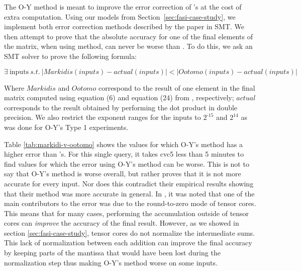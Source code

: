 The O-Y method is meant to improve the error correction of \citeauthor{markidis}'s at the cost of extra computation.  Using our models from Section~\ref{sec:fasi-case-study}, we implement both error correction methods described by the paper in SMT.  We then attempt to prove that the absolute accuracy for one of the final elements of the matrix, when using \cite{ootomo2022recovering} method, can never be worse than \cite{markidis}. To do this, we ask an SMT solver to prove the following formula:
\begin{myprop}
$\exists~\text{inputs}~s.t.~|Markidis(inputs) - actual(inputs)| < |Ootomo(inputs) - actual(inputs)|$ 
\end{myprop}
Where $Markidis$ and $Ootomo$ correspond to the result of one element in the final matrix computed using equation (6) and equation (24) from \citet{ootomo2022recovering}, respectively; $actual$ corresponds to the result obtained by performing the dot product in double precision. We also restrict the exponent ranges for the inputs to $2^{\text{-}15}$ and $2^{14}$ as was done for O-Y's Type 1 experiments.

Table \ref{tab:markidi-v-ootomo} shows the values for which O-Y's method has a higher error than \citeauthor{markidis}'s.  For this single query, it takes cvc5 less than 5 minutes
to find values for which the error using O-Y's method can be worse.  This is not to say that O-Y's method is worse overall, but rather proves that it is not more accurate for every input.  Nor does this contradict their empirical results showing that their method was more accurate in general.  In \citet{ootomo2022recovering}, it was noted that one of the main contributors to the error was due to the round-to-zero mode of tensor cores.  This means that for many cases, performing the accumulation outside of tensor cores can \emph{improve} the accuracy of the final result.  However, as we showed in section \ref{sec:fasi-case-study}, tensor cores do not normalize the intermediate sums.  This lack of normalization between each addition can improve the final accuracy by keeping parts of the mantissa that would have been lost during the normalization step thus making O-Y's method worse on some inputs.

